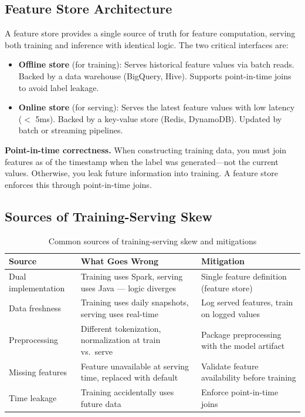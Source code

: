 \subsection{Feature Store Architecture}

A feature store provides a single source of truth for feature computation, serving both training and inference with identical logic. The two critical interfaces are:

\begin{itemize}
    \item \textbf{Offline store} (for training): Serves historical feature values via batch reads. Backed by a data warehouse (BigQuery, Hive). Supports point-in-time joins to avoid label leakage.
    \item \textbf{Online store} (for serving): Serves the latest feature values with low latency ($<$ 5ms). Backed by a key-value store (Redis, DynamoDB). Updated by batch or streaming pipelines.
\end{itemize}

\textbf{Point-in-time correctness.} When constructing training data, you must join features as of the timestamp when the label was generated---not the current values. Otherwise, you leak future information into training. A feature store enforces this through point-in-time joins.

\subsection{Sources of Training-Serving Skew}

\begin{table}[H]
\centering
\caption{Common sources of training-serving skew and mitigations}
\begin{tabularx}{\textwidth}{lXX}
\toprule
\textbf{Source} & \textbf{What Goes Wrong} & \textbf{Mitigation} \\
\midrule
Dual implementation & Training uses Spark, serving uses Java --- logic diverges & Single feature definition (feature store) \\
Data freshness & Training uses daily snapshots, serving uses real-time & Log served features, train on logged values \\
Preprocessing & Different tokenization, normalization at train vs.\ serve & Package preprocessing with the model artifact \\
Missing features & Feature unavailable at serving time, replaced with default & Validate feature availability before training \\
Time leakage & Training accidentally uses future data & Enforce point-in-time joins \\
\bottomrule
\end{tabularx}
\end{table}

